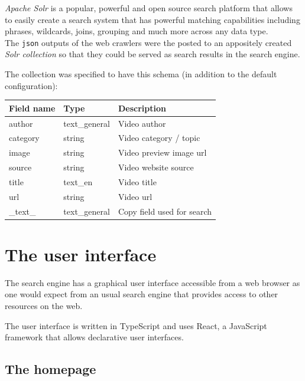 \documentclass[12pt,numbers=enddot]{exam}
\begin{document}
\textit{Apache Solr} is a popular, powerful and open source search platform
that allows to easily create a search system that has powerful matching
capabilities including phrases, wildcards, joins, grouping and much more
across any data type. \\

The \texttt{json} outputs of the web crawlers were the posted to
an appositely created \textit{Solr collection} so that they could be served
as search results in the search engine.

The collection was specified to have this schema (in addition to the default
configuration):

\begin{center}
\begin{tabular}{lll}
Field name & Type          & Description                \\\hline
author     & text\_general & Video author               \\
category   & string        & Video category / topic     \\
image      & string        & Video preview image url    \\
source     & string        & Video website source       \\
title      & text\_en      & Video title                \\
url        & string        & Video url                  \\\hline
\_text\_   & text\_general & Copy field used for search \\
\end{tabular}
\end{center}

\newpage

\section{The user interface}

The search engine has a graphical user interface accessible from a web
browser as one would expect from an usual search engine that provides
access to other resources on the web.

The user interface is written in TypeScript and uses React, a JavaScript
framework that allows declarative user interfaces.

\subsection{The homepage}
\end{document}
